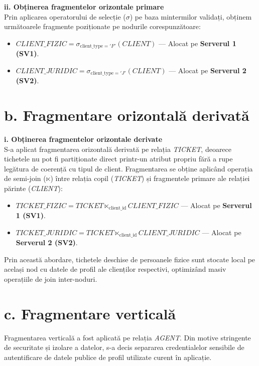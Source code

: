 \textbf{ii. Obținerea fragmentelor orizontale primare}\\
Prin aplicarea operatorului de selecție ($\sigma$) pe baza mintermilor validați, obținem următoarele fragmente poziționate pe nodurile corespunzătoare:
\begin{itemize}
    \item $CLIENT\_FIZIC = \sigma_{\text{client\_type}='F'}(CLIENT)$ --- Alocat pe \textbf{Serverul 1 (SV1)}.
    \item $CLIENT\_JURIDIC = \sigma_{\text{client\_type}='J'}(CLIENT)$ --- Alocat pe \textbf{Serverul 2 (SV2)}.
\end{itemize}

\section*{b. Fragmentare orizontală derivată}

\textbf{i. Obținerea fragmentelor orizontale derivate}\\
S-a aplicat fragmentarea orizontală derivată pe relația \textit{TICKET}, deoarece tichetele nu pot fi partiționate direct printr-un atribut propriu fără a rupe legătura de coerență cu tipul de client. Fragmentarea se obține aplicând operația de semi-join ($\ltimes$) între relația copil (\textit{TICKET}) și fragmentele primare ale relației părinte (\textit{CLIENT}):
\begin{itemize}
    \item $TICKET\_FIZIC = TICKET \ltimes_{\text{client\_id}} CLIENT\_FIZIC$ --- Alocat pe \textbf{Serverul 1 (SV1)}.
    \item $TICKET\_JURIDIC = TICKET \ltimes_{\text{client\_id}} CLIENT\_JURIDIC$ --- Alocat pe \textbf{Serverul 2 (SV2)}.
\end{itemize}
Prin această abordare, tichetele deschise de persoanele fizice sunt stocate local pe același nod cu datele de profil ale clienților respectivi, optimizând masiv operațiile de join inter-noduri.

\section*{c. Fragmentare verticală}

Fragmentarea verticală a fost aplicată pe relația \textit{AGENT}. Din motive stringente de securitate și izolare a datelor, s-a decis separarea credentialelor sensibile de autentificare de datele publice de profil utilizate curent în aplicație.

